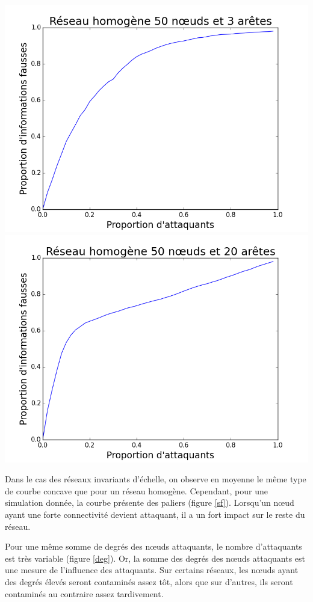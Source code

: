 \documentclass[12pt,a4paper]{article}
\begin{document}
\begin{center}
\includegraphics[width=0.49\linewidth]{../resultats/atkaleat/atkaleat-50-3-2-i100.png}
\includegraphics[width=0.49\linewidth]{../resultats/atkaleat/atkaleat-50-20-2-i100.png}
 \label{aretes}
\end{center}

Dans le cas des réseaux invariants d'échelle, on observe en moyenne le même type de courbe concave que pour un réseau homogène.
Cependant, pour une simulation donnée, la courbe présente des paliers (figure \ref{sf}).
Lorsqu'un nœud ayant une forte connectivité devient attaquant, il a un fort impact sur le reste du réseau.

Pour une même somme de degrés des nœuds attaquants, le nombre d'attaquants est très variable (figure \ref{deg}).
Or, la somme des degrés des nœuds attaquants est une mesure de l'influence des attaquants.
Sur certains réseaux, les nœuds ayant des degrés élevés seront contaminés assez tôt, alors que sur d'autres, ils seront contaminés au contraire assez tardivement.
\end{document}
